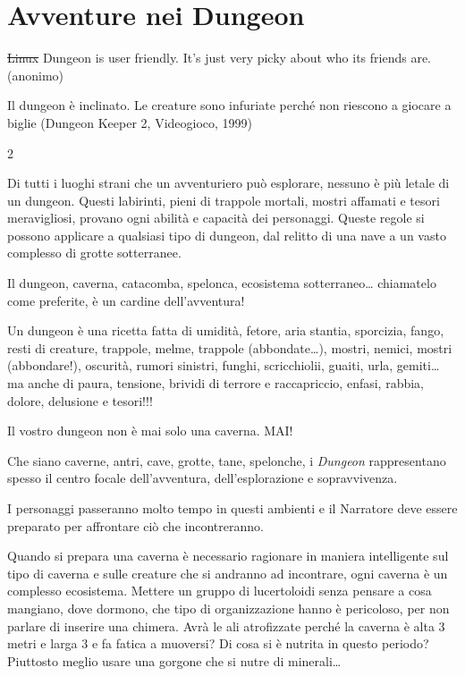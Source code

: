 \section{Avventure nei Dungeon}

\begin{enfasi}{

\st{Linux} Dungeon is user friendly. It's just very picky about who its friends are. (anonimo)

\medskip

Il dungeon è inclinato. Le creature sono infuriate perché non riescono a giocare a biglie (Dungeon Keeper 2, Videogioco, 1999)

}\end{enfasi}

\label{avventure-nei-dungeon}
\begin{multicols}{2}

Di tutti i luoghi strani che un avventuriero può esplorare, nessuno è più letale di un dungeon. Questi labirinti, pieni di trappole mortali, mostri affamati e tesori meravigliosi, provano ogni abilità e capacità dei personaggi. Queste regole si possono applicare a qualsiasi tipo di dungeon, dal relitto di una nave a un vasto complesso di grotte sotterranee.

\begin{narratore}[Dungeon!!!]
Il dungeon, caverna, catacomba, spelonca, ecosistema sotterraneo… chiamatelo come preferite, è un cardine dell'avventura!

Un dungeon è una ricetta fatta di umidità, fetore, aria stantia, sporcizia, fango, resti di creature, trappole, melme, trappole (abbondate…), mostri, nemici, mostri (abbondare!), oscurità, rumori sinistri, funghi, scricchiolii, guaiti, urla, gemiti… ma anche di paura, tensione, brividi di terrore e raccapriccio, enfasi, rabbia, dolore, delusione e tesori!!!

Il vostro dungeon non è mai solo una caverna. MAI!
\end{narratore}


Che siano caverne, antri, cave, grotte, tane, spelonche, i \emph{Dungeon} rappresentano spesso il centro focale dell'avventura, dell'esplorazione e sopravvivenza.

I personaggi passeranno molto tempo in questi ambienti e il Narratore deve essere preparato per affrontare ciò che incontreranno.

Quando si prepara una caverna è necessario ragionare in maniera intelligente sul tipo di caverna e sulle creature che si andranno ad incontrare, ogni caverna è un complesso ecosistema.
Mettere un gruppo di lucertoloidi senza pensare a cosa mangiano, dove dormono, che tipo di organizzazione hanno è pericoloso, per non parlare di inserire una chimera.
Avrà le ali atrofizzate perché la caverna è alta 3 metri e larga 3 e fa fatica a muoversi? Di cosa si è nutrita in questo periodo? Piuttosto meglio usare una gorgone che si nutre di minerali…


\end{multicols}
